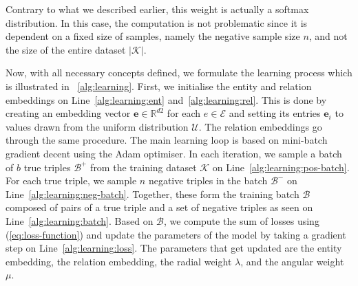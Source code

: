 Contrary to what we described earlier, this weight is actually a softmax distribution.
In this case, the computation is not problematic since it is dependent on a fixed size of samples, namely the negative sample size $n$, and not the size of the entire dataset $|\mathcal{K}|$.

Now, with all necessary concepts defined, we formulate the learning process which is illustrated in \figurename~\ref{alg:learning}.
First, we initialise the entity and relation embeddings on Line~\ref{alg:learning:ent} and~\ref{alg:learning:rel}.
This is done by creating an embedding vector $\bm{e} \in \mathbb{R}^{d2}$ for each $e \in \mathcal{E}$ and setting its entries $\bm{e}_i$ to values drawn from the uniform distribution $\mathcal{U}$.
The relation embeddings go through the same procedure.
The main learning loop is based on mini-batch gradient decent using the Adam optimiser\cite{Kingma2014}.
In each iteration, we sample a batch of $b$ true triples $\mathcal{B}^+$ from the training dataset $\mathcal{K}$ on Line~\ref{alg:learning:pos-batch}.
For each true triple, we sample $n$ negative triples in the batch $\mathcal{B}^-$ on Line~\ref{alg:learning:neg-batch}.
Together, these form the training batch $\mathcal{B}$ composed of pairs of a true triple and a set of negative triples as seen on Line~\ref{alg:learning:batch}.
Based on $\mathcal{B}$, we compute the sum of losses using (\ref{eq:loss-function}) and update the parameters of the model by taking a gradient step on Line~\ref{alg:learning:loss}.
The parameters that get updated are the entity embedding, the relation embedding, the radial weight $\lambda$, and the angular weight $\mu$.

